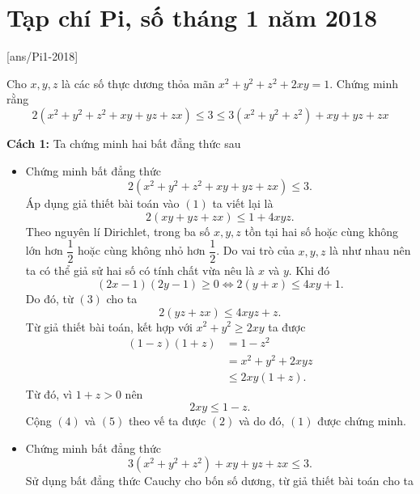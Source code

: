 \section{Tạp chí Pi, số tháng 1 năm 2018}
[ans/Pi1-2018]

\begin{bt}%
	Cho $x,y,z$ là các số thực dương thỏa mãn $x^2+y^2+z^2+2xy=1$.
	Chứng minh rằng $$2(x^2+y^2+z^2+xy+yz+zx)\leq 3\leq 3(x^2+y^2+z^2)+xy+yz+zx$$
	\loigiai
	{\noindent\textbf{Cách 1:} Ta chứng minh hai bất đẳng thức sau
		\begin{itemize}
			\item Chứng minh bất đẳng thức 
			\begin{equation}
			\tag{1}
			2(x^2+y^2+z^2+xy+yz+zx)\leq 3.
			\end{equation}
			Áp dụng giả thiết bài toán vào $(1)$ ta viết lại là 
			\begin{equation}
			\tag{2}
			2(xy+yz+zx)\leq 1+4xyz.
			\end{equation}
			Theo nguyên lí Dirichlet, trong ba số $x,y,z$ tồn tại hai số hoặc cùng không lớn hơn $\dfrac{1}{2}$ hoặc cùng không nhỏ hơn $\dfrac{1}{2}$. Do vai trò của $x,y,z$ là như nhau nên ta có thể giả sử hai số có tính chất vừa nêu là $x$ và $y$. Khi đó
			\begin{equation}
			\tag{3}
			(2x-1)(2y-1)\geq 0 \Leftrightarrow 2(y+x)\leq 4xy+1.
			\end{equation}
			Do đó, từ $(3)$ cho ta 
			\begin{equation}
			\tag{4}
			2(yz+zx)\leq 4xyz+z.
			\end{equation}
			Từ giả thiết bài toán, kết hợp với $x^2+y^2\geq 2xy$ ta được
			\begin{align*}
			(1-z)(1+z)&=1-z^2\\
			&= x^2+y^2+2xyz\\
			&\leq 2xy(1+z).
			\end{align*}
			Từ đó, vì $1+z>0$ nên 
			\begin{equation}
			\tag{5}
			2xy\leq 1-z.
			\end{equation}
			Cộng $(4)$ và $(5)$ theo vế ta được $(2)$ và do đó, $(1)$ được chứng minh.
			\item Chứng minh bất đẳng thức
			\begin{equation}
			\tag{6}
			3(x^2+y^2+z^2)+xy+yz+zx\leq 3.
			\end{equation}
			Sử dụng bất đẳng thức Cauchy cho bốn số dương, từ giả thiết bài toán cho ta

\end{itemize}}
\end{bt}

